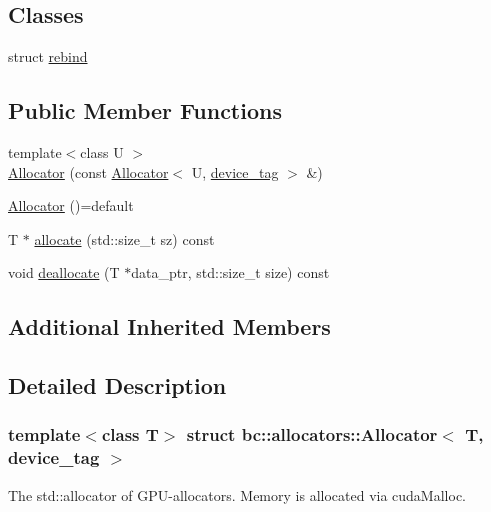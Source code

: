 \subsection*{Classes}
\begin{DoxyCompactItemize}
\item 
struct \hyperlink{structbc_1_1allocators_1_1Allocator_3_01T_00_01device__tag_01_4_1_1rebind}{rebind}
\end{DoxyCompactItemize}
\subsection*{Public Member Functions}
\begin{DoxyCompactItemize}
\item 
{\footnotesize template$<$class U $>$ }\\\hyperlink{structbc_1_1allocators_1_1Allocator_3_01T_00_01device__tag_01_4_a88d0cc2114abb58361cfa739f1e190e7}{Allocator} (const \hyperlink{classbc_1_1allocators_1_1Allocator}{Allocator}$<$ U, \hyperlink{structbc_1_1device__tag}{device\+\_\+tag} $>$ \&)
\item 
\hyperlink{structbc_1_1allocators_1_1Allocator_3_01T_00_01device__tag_01_4_aef910f60bb75fdfc303d99aa779d1de1}{Allocator} ()=default
\item 
T $\ast$ \hyperlink{structbc_1_1allocators_1_1Allocator_3_01T_00_01device__tag_01_4_a140957d76e4b582ca2b85b52a8417cd0}{allocate} (std\+::size\+\_\+t sz) const
\item 
void \hyperlink{structbc_1_1allocators_1_1Allocator_3_01T_00_01device__tag_01_4_a80060f1c76c04adb6f48e4645896ec77}{deallocate} (T $\ast$data\+\_\+ptr, std\+::size\+\_\+t size) const
\end{DoxyCompactItemize}
\subsection*{Additional Inherited Members}


\subsection{Detailed Description}
\subsubsection*{template$<$class T$>$\newline
struct bc\+::allocators\+::\+Allocator$<$ T, device\+\_\+tag $>$}

The \textquotesingle{}std\+::allocator\textquotesingle{} of G\+P\+U-\/allocators. Memory is allocated via \textquotesingle{}cuda\+Malloc\textquotesingle{}. 

